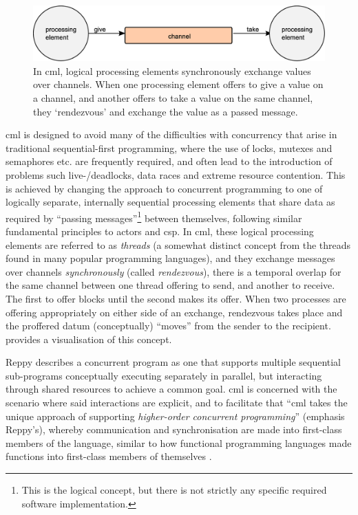 \begin{figure}
    \centering
    \includegraphics[width=\textwidth]{chapters/background/images/cml_exchange.eps}
    \caption[Diagram of the message-passing primitive in ]{In \gls{cml}, logical processing elements synchronously exchange values over channels.  When one processing element offers to give a value on a channel, and another offers to take a value on the same channel, they `rendezvous' and exchange the value as a passed message.}
    \label{fig:back:cml_exchange}
\end{figure}

\Gls{cml} is designed to avoid many of the difficulties with concurrency that arise in traditional sequential-first programming, where the use of locks, mutexes and semaphores etc. are frequently required, and often lead to the introduction of problems such live-/deadlocks, data races and extreme resource contention.  This is achieved by changing the approach to concurrent programming to one of logically separate, internally sequential processing elements that share data as required by ``passing messages''\footnote{This is the logical concept, but there is not strictly any specific required software implementation.} between themselves, following similar fundamental principles to \glspl{actor} and \gls{csp}.  In \gls{cml}, these logical processing elements are referred to as \emph{threads} (a somewhat distinct concept from the threads found in many popular programming languages), and they exchange messages over channels \emph{synchronously} (called \emph{rendezvous}), \ie{} there is a temporal overlap for the same channel between one thread offering to send, and another to receive.  The first to offer blocks until the second makes its offer.  When two processes are offering appropriately on either side of an exchange, rendezvous takes place and the proffered datum (conceptually) ``moves'' from the sender to the recipient.   provides a visualisation of this concept.

Reppy describes a concurrent program as one that supports multiple sequential sub-programs conceptually executing separately in parallel, but interacting through shared resources to achieve a common goal.  \Gls{cml} is concerned with the scenario where said interactions are explicit, and to facilitate that \enquote{\gls{cml} takes the unique approach of supporting \emph{higher-order concurrent programming}} (emphasis Reppy's), whereby communication and synchronisation are made into first-class members of the language, similar to how functional programming languages made functions into first-class members of themselves \cite[Preface]{Reppy2007}.